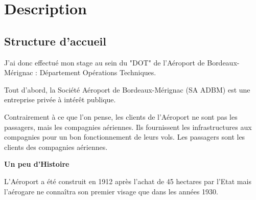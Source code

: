 \section{Description}

\subsection{Structure d'accueil}

J'ai donc effectué mon stage au sein du "DOT" de l'Aéroport de Bordeaux-Mérignac : Département Opérations Techniques.

Tout d'abord, la Société Aéroport de Bordeaux-Mérignac (SA ADBM) est une entreprise privée à intérêt publique.

Contrairement à ce que l'on pense, les clients de l'Aéroport ne sont pas les passagers, mais les compagnies aériennes. Ils fournissent les infrastructures aux compagnies pour un bon fonctionnement de leurs vols. Les passagers sont les clients des compagnies aériennes.\newline


\textbf{Un peu d'Histoire}\newline

L'Aéroport a été construit en 1912 après l'achat de 45 hectares par l'Etat mais l'aérogare ne connaîtra son premier visage que dans les années 1930.

